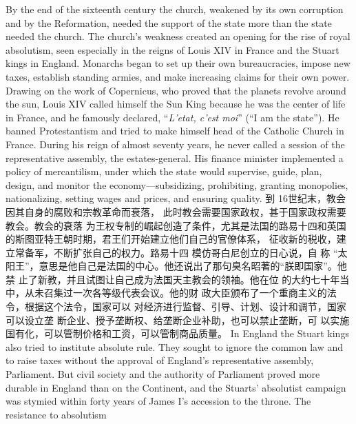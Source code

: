 \begin{paracol}{2}
By the end of the sixteenth century the church, weakened by its
own corruption and by the Reformation, needed the support of
the state more than the state needed the church. The church's
weakness created an opening for the rise of royal absolutism,
seen especially in the reigns of Louis XIV in France and the Stuart kings in England. Monarchs began to set up their own bureaucracies, impose new taxes, establish standing armies, and
make increasing claims for their own power. Drawing on the
work of Copernicus, who proved that the planets revolve
around the sun, Louis XIV called himself the Sun King because
he was the center of life in France, and he famously declared,
``\textit{L'etat, c'est moi}'' (``I am the state''). He banned Protestantism
and tried to make himself head of the Catholic Church in
France. During his reign of almost seventy years, he never
called a session of the representative assembly, the estates-general. His finance minister implemented a policy of mercantilism, under which the state would supervise, guide, plan, design,
and monitor the economy---subsidizing, prohibiting, granting
monopolies, nationalizing, setting wages and prices, and ensuring quality.
\switchcolumn
到 16世纪末，教会因其自身的腐败和宗教革命而衰落，
此时教会需要国家政权，甚于国家政权需要教会。教会的衰落
为王权专制的崛起创造了条件，尤其是法国的路易十四和英国
的斯图亚特王朝时期，君王们开始建立他们自己的官僚体系，
征收新的税收，建立常备军，不断扩张自己的权力。路易十四
模仿哥白尼创立的日心说，自 称 “太阳王”，意思是他自己是法国的中心。他还说出了那句臭名昭著的“朕即国家”。他禁
止了新教，并且试图让自己成为法国天主教会的领袖。他在位
的大约七十年当中，从未召集过一次各等级代表会议。他的财
政大臣颁布了一个重商主义的法令，根据这个法令，国家可以
对经济进行监督、引导、计划、设计和调节，国家可以设立垄
断企业、授予垄断权、给垄断企业补助，也可以禁止垄断，可
以实施国有化，可以管制价格和工资，可以管制商品质量。
\switchcolumn*
In England the Stuart kings also tried to institute absolute
rule. They sought to ignore the common law and to raise taxes without the approval of England's representative assembly, Parliament. But civil society and the authority of Parliament proved
more durable in England than on the Continent, and the Stuarts' absolutist campaign was stymied within forty years of
James I's accession to the throne. The resistance to absolutism

\end{paracol}
